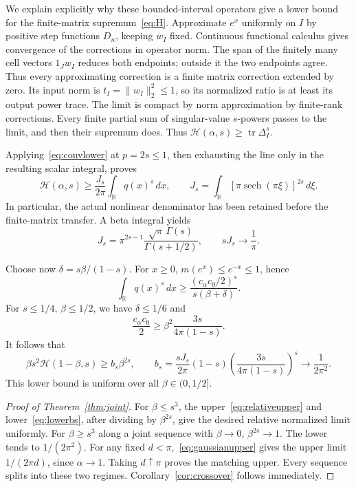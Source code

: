 \documentclass[11pt]{article}
\numberwithin{equation}{section}
\newcommand{\tr}{\operatorname{tr}}
\newcommand{\R}{\mathbb R}
\newcommand{\cH}{\mathcal H}
\newcommand{\sech}{\operatorname{sech}}
\begin{document}
We explain explicitly why these bounded-interval operators give a
lower bound for the finite-matrix supremum~\eqref{eq:H}.
Approximate $e^x$ uniformly on $I$ by positive step functions $D_n$,
keeping $w_I$ fixed. Continuous functional calculus gives convergence
of the corrections in operator norm. The span of the finitely many
cell vectors $1_Jw_I$ reduces both endpoints; outside it the two
endpoints agree. Thus every approximating correction is a finite
matrix correction extended by zero. Its input norm is
$t_I=\|w_I\|_2^2\le1$, so its normalized ratio is at least its
output power trace. The limit is compact by norm approximation by
finite-rank corrections. Every finite partial sum of singular-value
$s$-powers passes to the limit, and then their supremum does.
Thus $\cH(\alpha,s)\ge\tr\Delta_I^s$.

Applying~\eqref{eq:convlower} at $p=2s\le1$, then exhausting the
line only in the resulting scalar integral, proves
\begin{equation}\label{eq:nonlinearlower}
 \cH(\alpha,s)\ge\frac{J_s}{2\pi}\int_\R q(x)^s\,dx,
 \qquad
 J_s=\int_\R[\pi\sech(\pi\xi)]^{2s}\,d\xi.
\end{equation}
In particular, the actual nonlinear denominator has been retained
before the finite-matrix transfer. A beta integral yields
\begin{equation}\label{eq:J}
 J_s=\pi^{2s-1}\frac{\sqrt\pi\,\Gamma(s)}{\Gamma(s+1/2)},
 \qquad sJ_s\longrightarrow\frac1\pi.
\end{equation}

Choose now $\delta=s\beta/(1-s)$. For $x\ge0$,
$m(e^x)\le e^{-x}\le1$, hence
\[
 \int_\R q(x)^s\,dx
       \ge\frac{(c_\alpha c_0/2)^s}{s(\beta+\delta)}.
\]
For $s\le1/4$, $\beta\le1/2$, we have $\delta\le1/6$ and
\[
 \frac{c_\alpha c_0}{2}\ge
          \beta^2\frac{3s}{4\pi(1-s)}.
\]
It follows that
\begin{equation}\label{eq:lowerbs}
 \beta s^2\cH(1-\beta,s)\ge b_s\beta^{2s},\qquad
 b_s=\frac{sJ_s}{2\pi}(1-s)
                  \left(\frac{3s}{4\pi(1-s)}\right)^s
       \longrightarrow\frac1{2\pi^2}.
\end{equation}
This lower bound is uniform over all $\beta\in(0,1/2]$.

\begin{proof}[Proof of Theorem~\ref{thm:joint}]
For $\beta\le s^3$, the upper~\eqref{eq:relativeupper} and
lower~\eqref{eq:lowerbs}, after dividing by $\beta^{2s}$,
give the desired relative normalized limit uniformly.
For $\beta\ge s^3$ along a joint sequence with $\beta\to0$,
$\beta^{2s}\to1$. The lower tends to $1/(2\pi^2)$.
For any fixed $d<\pi$,~\eqref{eq:gaussianupper} gives the upper
limit $1/(2\pi d)$, since $\alpha\to1$. Taking $d\uparrow\pi$
proves the matching upper. Every sequence splits into these two
regimes. Corollary~\ref{cor:crossover} follows immediately.
\end{proof}
\end{document}
